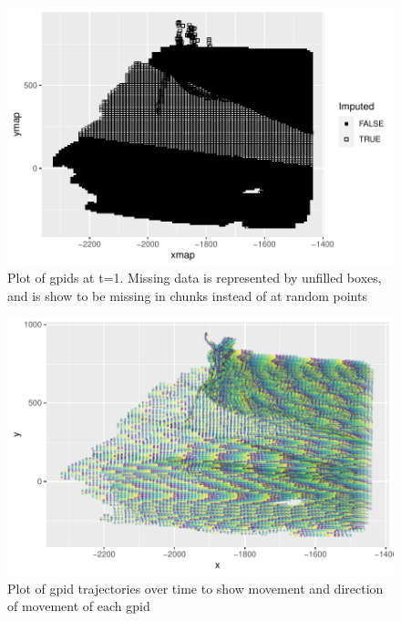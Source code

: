\documentclass[12pt]{article}
\begin{document}
\begin{figure}[tbp]

{\centering \includegraphics[width=\linewidth,]{spatio-temporal-model-arctic-sea-ice_files/figure-latex/clustering-at-51-1} 

}

\caption{Plot of gpids at t=1. Missing data is represented by unfilled boxes, and is show to be missing in chunks instead of at random points}\label{fig:clustering-at-51}
\end{figure}

\begin{figure}[tbp]

{\centering \includegraphics[width=\linewidth,]{spatio-temporal-model-arctic-sea-ice_files/figure-latex/trajectories-1} 

}

\caption{Plot of gpid trajectories over time to show movement and direction of movement of each gpid}\label{fig:trajectories}
\end{figure}
\end{document}
